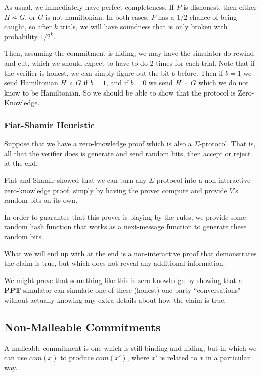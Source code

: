 \documentclass[11pt]{article}
\newcommand{\PPT}{\mathbf{PPT}}
\begin{document}
As usual, we immediately have perfect completeness. If \(P\) is dishonest, then either \(H\not\sim G\), or \(G\) is not hamiltonian. In both cases, \(P\) has a \(1/2\) chance of being caught, so after \(k\) trials, we will have soundness that is only broken with probability \(1/2^k\).\medskip

Then, assuming the commitment is hiding, we may have the simulator do rewind-and-cut, which we should expect to have to do 2 times for each trial. Note that if the verifier is honest, we can simply figure out the bit \(b\) before. Then if \(b=1\) we send Hamiltonian \(H\not\sim G\) if \(b=1\), and if \(b=0\) we send \(H\sim G\) which we do not know to be Hamiltonian. So we should be able to show that the protocol is Zero-Knowledge.

\subsubsection{Fiat-Shamir Heuristic}

Suppose that we have a zero-knowledge proof which is also a \(\Sigma\)-protocol. That is, all that the verifier does is generate and send random bits, then accept or reject at the end.\medskip

Fiat and Shamir showed that we can turn any \(\Sigma\)-protocol into a non-interactive zero-knowledge proof, simply by having the prover compute and provide \(V\)'s random bits on its own.\smallskip

In order to guarantee that this prover is playing by the rules, we provide some random hash function that works as a next-message function to generate these random bits.\smallskip

What we will end up with at the end is a non-interactive proof that demonstrates the claim is true, but which does not reveal any additional information.\bigskip

We might prove that something like this is zero-knowledge by showing that a \(\PPT\) simulator can simulate one of these (honest) one-party ``conversations" without actually knowing any extra details about how the claim is true.


\newpage
\subsection{Non-Malleable Commitments}
A malleable commitment is one which is still binding and hiding, but in which we can use \(com(x)\) to produce \(com(x')\), where \(x'\) is related to \(x\) in a particular way.
\end{document}
